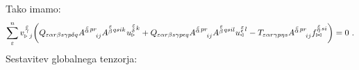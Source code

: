 Tako imamo:
\begin{equation}
   \sum^n_\varepsilon v^{\mkern 2mu \substack{\varepsilon \\[-0.65mm] \gamma \\[-0.2mm]}}_{\triangleright \mkern5mu j}
   \qty( Q_{\varepsilon   \alpha r   \beta s   \gamma p   \delta q}
   A^{\substack{\mkern2mu \varepsilon \\[-0.65mm] \alpha} \mkern2mu p r}_{\mkern29mu i j}
   A^{\substack{\mkern2mu \varepsilon \\[0.05mm] \beta} \mkern2mu q s i k} \mkern1mu
   u^{\substack{\mkern2mu \varepsilon \\[0.09mm] \delta} \mkern2mu k}_\triangleright
   +
   Q_{\varepsilon   \alpha r   \beta s   \gamma p   \epsilon q}
   A^{\substack{\mkern2mu \varepsilon \\[-0.65mm] \alpha} \mkern2mu p r}_{\mkern29mu i j}
   A^{\substack{\mkern2mu \varepsilon \\[0.05mm] \beta} \mkern2mu q s i l}
   u^{\substack{\mkern2mu \varepsilon \\[-0.55mm] \epsilon} \mkern2mu l}_\triangleleft
   -
   T_{\varepsilon   \alpha r   \gamma p   \eta s}
   A^{\substack{\mkern2mu \varepsilon \\[-0.65mm] \alpha} \mkern2mu p r}_{\mkern29mu i j}
   f^{\substack{\mkern2mu \varepsilon \\[-0.59mm] \eta} \mkern2mu s i}_{\bowtie}
   ) = 0 \ .
\end{equation}
Sestavitev globalnega tenzorja:
